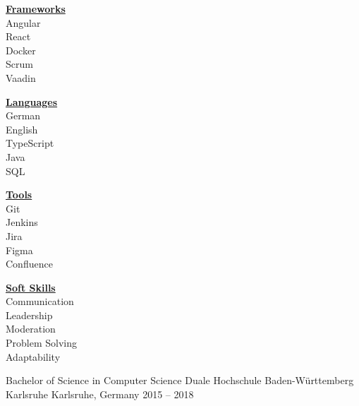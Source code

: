 \documentclass[10pt, a4paper]{cvhari}
\begin{document}
    \bigskip
    \begin{minipage}[t]{0.23\textwidth}
            \centering
            \underline{\textbf{Frameworks}}\\[0.5em]
            Angular\\
            React\\
            Docker\\
            Scrum\\
            Vaadin\\
    \end{minipage}
    \hfill
    \begin{minipage}[t]{0.23\textwidth}
            \centering
            \underline{\textbf{Languages}}\\[0.5em]
            German\\
            English\\
            TypeScript\\
            Java\\
            SQL\\
    \end{minipage}
    \hfill
    \begin{minipage}[t]{0.23\textwidth}
            \centering
            \underline{\textbf{Tools}}\\[0.5em]
            Git\\
            Jenkins\\
            Jira\\
            Figma\\
            Confluence\\
    \end{minipage}
    \hfill
    \begin{minipage}[t]{0.23\textwidth}
            \centering
            \underline{\textbf{Soft Skills}}\\[0.5em]
            Communication\\
            Leadership\\
            Moderation\\
            Problem Solving\\
            Adaptability\\
    \end{minipage}
\medskip

\medskip
\education
    {Bachelor of Science in Computer Science}
    {Duale Hochschule Baden-Württemberg Karlsruhe} 
    {Karlsruhe, Germany}
    {2015 -- 2018}
    \par
    \dividergray
    
\end{document}
